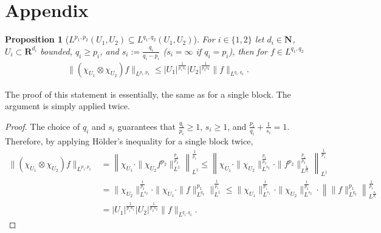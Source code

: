\documentclass[a4paper]{article}
\newcommand{\nn}[1]{\mathbf{N}^{#1}}
\newcommand{\rr}[1]{\mathbf{R}^{#1}}
\newcommand{\norm}[2]{\|#1\|_{#2}}
\newcommand{\normbig}[2]{\left\|#1\right\|_{#2}}
\newcommand{\chF}[1]{\chi_{#1}}
\numberwithin{equation}{section}
\newtheorem{proposition}[theorem]{Proposition}
\theoremstyle{remark}
\begin{document}
\section{Appendix}
\begin{proposition}[\(L^{p_1,p_2}(U_1,U_2)\subseteq L^{q_1,q_2}(U_1,U_2)\)]
\label{prop:Lpp_inclusion}
    For \(i\in\{1,2\}\) let \(d_i\in\nn{}\),
    \(U_i\subset\rr{d_i}\) bounded, \(q_i\geq p_i\),
    and \(s_i:=\frac{q_i}{q_i-p_i}\) (\(s_i=\infty\) if \(q_i=p_i\)),
    then for $f\in L^{q_1,q_2}$
    \begin{align*}
        \norm{(\chF{U_1}\otimes\chF{U_2})f}{L^{p_1,p_2}}
        \leq |U_1|^{\frac{1}{p_1s_1}}|U_2|^{\frac{1}{p_2s_2}}\norm{f}{L^{q_1,q_2}}.
    \end{align*}
\end{proposition}
The proof of this statement is essentially, the same as for a single block.
The argument is simply applied twice.
\begin{proof}
    The choice of \(q_i\) and \(s_i\) guarantees that \(\frac{q_i}{p_i}\geq 1\), \(s_i\geq 1\), and \(\frac{p_i}{q_i}+\frac{1}{s_i}=1\).
    Therefore, by applying Hölder's inequality for a single block twice,
    \begin{subequations}
    \begin{align*}
        \norm{(\chF{U_1}\otimes\chF{U_2})f}{L^{p_1,p_2}}
        &=
        \normbig{
            \chF{U_1}\cdot
            \norm{
                \chF{U_2}f^{p_2}
                }{L^1}^{\frac{p_1}{p_2}}
            }{L^1}^{\frac{1}{p_1}}
        \leq
        \normbig{
            \chF{U_1}\cdot
            \norm{
                \chF{U_2}
                }{L^{s_2}}^{\frac{p_1}{p_2}}\cdot
            \norm{
                f^{p_2}
                }{L^{\frac{q_2}{p_2}}}^{\frac{p_1}{p_2}}
            }{L^1}^{\frac{1}{p_1}}
            \\
        &=
        \norm{
            \chF{U_2}
            }{L^{s_2}}^{\frac{1}{p_2}}\cdot
        \norm{
            \chF{U_1}\cdot
            \norm{f}{L^{q_2}}^{p_1}
            }{L^1}^{\frac{1}{p_1}}
        \leq
        \norm{
            \chF{U_1}
            }{L^{s_1}}^{\frac{1}{p_1}}\cdot
        \norm{
            \chF{U_2}
            }{L^{s_2}}^{\frac{1}{p_2}}\cdot
        \normbig{
            \norm{f}{L^{q_2}}^{p_1}
            }{L^{\frac{q_1}{p_1}}}^{\frac{1}{p_1}}
            \\
        &=|U_1|^{\frac{1}{p_1s_1}}|U_2|^{\frac{1}{p_2s_2}}\norm{f}{L^{q_1,q_2}}.
    \end{align*}
    \end{subequations}
\end{proof}
\end{document}
